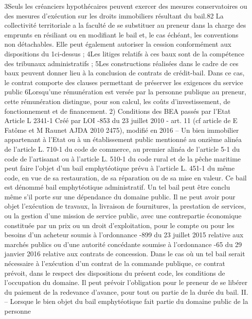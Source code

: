 \documentclass[11pt,a4paper]{report}
\begin{document}
3\degre  Seuls les créanciers hypothécaires peuvent exercer des mesures conservatoires ou des mesures d'exécution
sur les droits immobiliers résultant du bail.82
La collectivité territoriale a la faculté de se substituer au preneur dans la charge des emprunts en résiliant ou en
modifiant le bail et, le cas échéant, les conventions non détachables. Elle peut également autoriser la cession
conformément aux dispositions du 1\degre  ci-dessus ;
4\degre  Les litiges relatifs à ces baux sont de la compétence des tribunaux administratifs ;
5\degre  Les constructions réalisées dans le cadre de ces baux peuvent donner lieu à la conclusion de contrats de
crédit-bail. Dans ce cas, le contrat comporte des clauses permettant de préserver les exigences du service public
6\degre  Lorsqu'une rémunération est versée par la personne publique au preneur, cette rémunération distingue, pour
son calcul, les coûts d'investissement, de fonctionnement et de financement.
2) Conditions des BEA passés par l’Etat
Article L 2341-1 Créé par LOI -853 du 23 juillet 2010 - art. 11 (cf article de E Fatôme et M Raunet
AJDA 2010 2475), modifié en 2016
– Un bien immobilier appartenant à l'Etat ou à un établissement public mentionné au onzième alinéa
de l'article L. 710-1 du code de commerce, au premier alinéa de l'article 5-1 du code de l'artisanat ou
à l'article L. 510-1 du code rural et de la pêche maritime peut faire l'objet d'un bail emphytéotique
prévu à l'article L. 451-1 du même code, en vue de sa restauration, de sa réparation ou de sa mise en
valeur. Ce bail est dénommé bail emphytéotique administratif.
Un tel bail peut être conclu même s'il porte sur une dépendance du domaine public. Il ne peut avoir
pour objet l'exécution de travaux, la livraison de fournitures, la prestation de services, ou la gestion
d'une mission de service public, avec une contrepartie économique constituée par un prix ou un droit
d'exploitation, pour le compte ou pour les besoins d'un acheteur soumis à l'ordonnance -899
du 23 juillet 2015 relative aux marchés publics ou d'une autorité concédante soumise à l'ordonnance
-65 du 29 janvier 2016 relative aux contrats de concession.
Dans le cas où un tel bail serait nécessaire à l'exécution d'un contrat de la commande publique, ce
contrat prévoit, dans le respect des dispositions du présent code, les conditions de l'occupation du
domaine.
Il peut prévoir l'obligation pour le preneur de se libérer du paiement de la redevance d'avance, pour
tout ou partie de la durée du bail.
II. – Lorsque le bien objet du bail emphytéotique fait partie du domaine public de la personne
\end{document}
